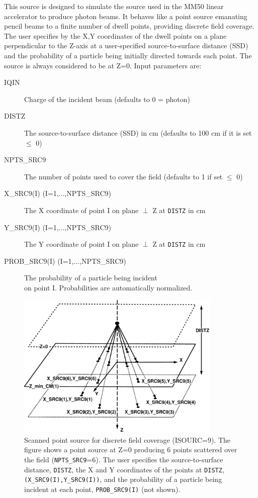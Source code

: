 \documentclass[12pt,twoside]{article}
\begin{document}
This source is designed to simulate the source used in the MM50 linear
accelerator to produce photon beams.  It behaves like a point source emanating
pencil beams to a finite number of dwell points, providing
discrete field coverage.  The user specifies by the X,Y coordinates
of the dwell points on a plane perpendicular to the Z-axis at
a user-specified source-to-surface distance (SSD) and the
probability of a particle being initially directed towards each point.
The source is always considered to be at Z=0.
Input parameters are:
\begin{description}
\item [IQIN] Charge of the incident beam (defaults to 0 = photon)
\item [DISTZ] The source-to-surface distance (SSD) in cm
(defaults to 100 cm if it is set $\leq$ 0)
\item [NPTS\_SRC9] The number of points used to cover the
field (defaults to 1 if set $\leq$ 0)
\item [X\_SRC9(I) (I=1,...,NPTS\_SRC9)] The X coordinate of
point I on plane $\perp$ Z at \verb+DISTZ+ in cm
\item [Y\_SRC9(I) (I=1,...,NPTS\_SRC9)] The Y coordinate of
point I on plane $\perp$ Z at \verb+DISTZ+ in cm
\item [PROB\_SRC9(I) (I=1,...,NPTS\_SRC9)] The probability of a particle
being incident\\ on point I.  Probabilities are automatically
normalized.
\end{description}
\begin{figure}[htbp]
\begin{center}
\leavevmode
\mbox{}\hspace{0cm}
\includegraphics[height=7cm]{figures/src9}
\caption[ISOURC=9: Discrete beams from point source.]
{Scanned point source for discrete field coverage (ISOURC=9).
The figure shows a point source at Z=0 producing 6 points scattered over
the field ({\tt NPTS\_SRC9}=6).  The user specifies the source-to-surface
distance, {\tt DISTZ}, the X and Y coordinates of the points at {\tt DISTZ},
{\tt (X\_SRC9(I),Y\_SRC9(I))}, and the probability of a particle being
incident at each point, {\tt PROB\_SRC9(I)} (not shown).  }
\label{fig_src9}
\end{center}
\end{figure}
\end{document}
